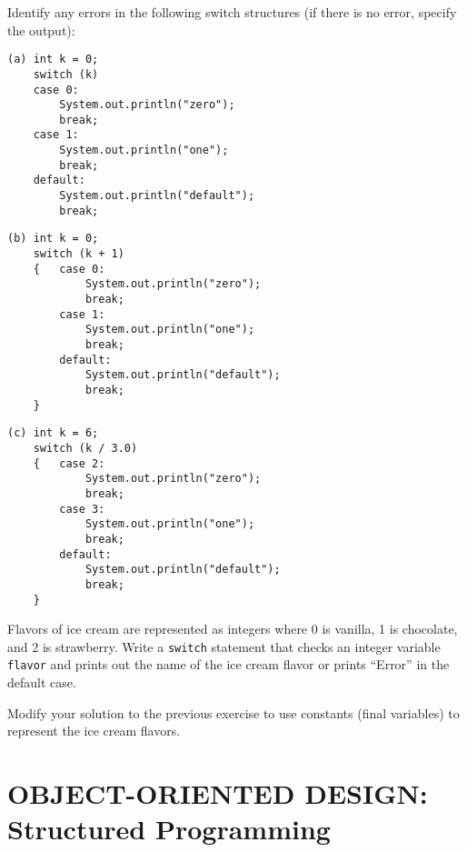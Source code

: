 \newpage
{}
\begin{SSTUDY}
\item  Identify any errors in the
following switch structures (if
there is no error, specify the output):

\begin{jjjlisting}
\begin{lstlisting}
(a) int k = 0;
    switch (k)
    case 0:
        System.out.println("zero");
        break;
    case 1:
        System.out.println("one");
        break;
    default:
        System.out.println("default");
        break;
\end{lstlisting}
\end{jjjlisting}

\begin{jjjlisting}
\begin{lstlisting}
(b) int k = 0;
    switch (k + 1)
    {   case 0:
            System.out.println("zero");
            break;
        case 1:
            System.out.println("one");
            break;
        default:
            System.out.println("default");
            break;
    }
\end{lstlisting}
\end{jjjlisting}
\begin{jjjlisting}
\begin{lstlisting}
(c) int k = 6;
    switch (k / 3.0)
    {   case 2:
            System.out.println("zero");
            break;
        case 3:
            System.out.println("one");
            break;
        default:
            System.out.println("default");
            break;
    }
\end{lstlisting}
\end{jjjlisting}

\item  Flavors of ice cream are represented as integers where 0 is
vanilla, 1 is chocolate, and 2 is strawberry.  Write a {\tt switch}
statement that checks an integer variable {\tt flavor} and prints
out the name of the ice cream flavor or prints ``Error'' in the
default case.

\item  Modify your solution to the previous exercise to use
constants (final variables) to represent the ice cream flavors.
\end{SSTUDY}


\section{OBJECT-ORIENTED DESIGN: \\Structured Programming}
\label{objectorienteddesign-structured-programming}

